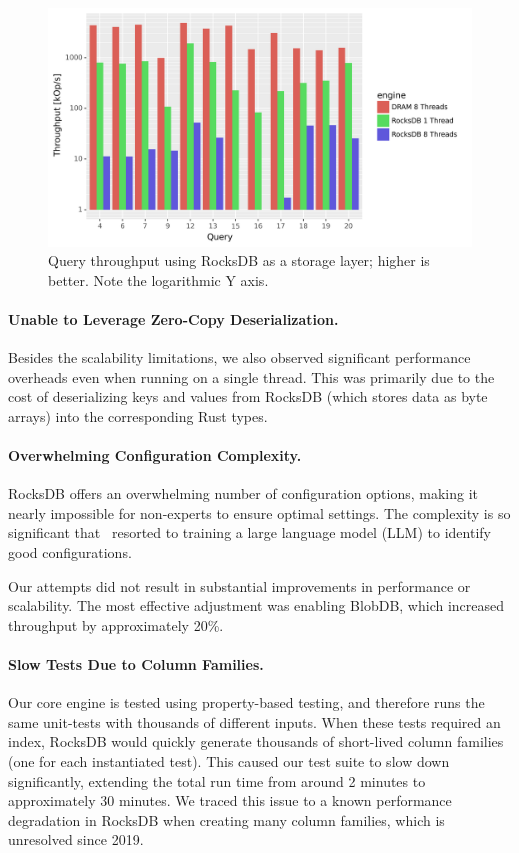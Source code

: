 \begin{figure}[h]
  \begin{center}
  \includegraphics[scale=.43]{graph/rocksdb}
  \caption{Query throughput using RocksDB as a storage layer; higher
    is better.  Note the logarithmic Y axis\label{fig:rocksdb}.}
  \end{center}
\end{figure}

\paragraph{Unable to Leverage Zero-Copy Deserialization.} Besides the
scalability limitations, we also observed significant performance
overheads even when running on a single thread. This was primarily due
to the cost of deserializing keys and values from RocksDB (which
stores data as byte arrays) into the corresponding Rust types.

\paragraph{Overwhelming Configuration Complexity.}

RocksDB offers an overwhelming number of configuration options, making
it nearly impossible for non-experts to ensure optimal settings. The
complexity is so significant that~\cite{thakkar-hotstorage24} resorted
to training a large language model (LLM) to identify good
configurations.

Our attempts did not result in substantial improvements in performance
or scalability. The most effective adjustment was enabling BlobDB,
which increased throughput by approximately 20\%.

\paragraph{Slow Tests Due to Column Families.} Our core engine is tested
using property-based testing, and therefore runs the same unit-tests
with thousands of different inputs.  When these tests required an
index, RocksDB would quickly generate thousands of short-lived column
families (one for each instantiated test).  This caused our test suite
to slow down significantly, extending the total run time from around 2
minutes to approximately 30 minutes.  We traced this issue to a known
performance degradation in RocksDB when creating many column families,
which is unresolved since 2019.

